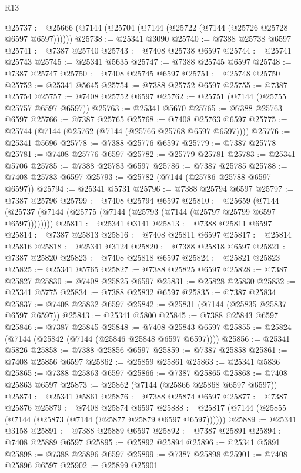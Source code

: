 \begin{lexlean}{R13}
\begin{coremodule}
@25737 := @25666 (@7144 (@25704 (@7144 (@25722 (@7144 (@25726 @25728 @6597 @6597))))))
@25738 := @25341 @3090
@25740 := @7388 @25738 @6597
@25741 := @7387 @25740
@25743 := @7408 @25738 @6597
@25744 := @25741 @25743
@25745 := @25341 @5635
@25747 := @7388 @25745 @6597
@25748 := @7387 @25747
@25750 := @7408 @25745 @6597
@25751 := @25748 @25750
@25752 := @25341 @5645
@25754 := @7388 @25752 @6597
@25755 := @7387 @25754
@25757 := @7408 @25752 @6597
@25762 := @25751 (@7144 (@25755 @25757 @6597 @6597))
@25763 := @25341 @5670
@25765 := @7388 @25763 @6597
@25766 := @7387 @25765
@25768 := @7408 @25763 @6597
@25775 := @25744 (@7144 (@25762 (@7144 (@25766 @25768 @6597 @6597))))
@25776 := @25341 @5696
@25778 := @7388 @25776 @6597
@25779 := @7387 @25778
@25781 := @7408 @25776 @6597
@25782 := @25779 @25781
@25783 := @25341 @5706
@25785 := @7388 @25783 @6597
@25786 := @7387 @25785
@25788 := @7408 @25783 @6597
@25793 := @25782 (@7144 (@25786 @25788 @6597 @6597))
@25794 := @25341 @5731
@25796 := @7388 @25794 @6597
@25797 := @7387 @25796
@25799 := @7408 @25794 @6597
@25810 := @25659
    (@7144 (@25737 (@7144 (@25775 (@7144 (@25793 (@7144 (@25797 @25799 @6597 @6597))))))))
@25811 := @25341 @3141
@25813 := @7388 @25811 @6597
@25814 := @7387 @25813
@25816 := @7408 @25811 @6597
@25817 := @25814 @25816
@25818 := @25341 @3124
@25820 := @7388 @25818 @6597
@25821 := @7387 @25820
@25823 := @7408 @25818 @6597
@25824 := @25821 @25823
@25825 := @25341 @5765
@25827 := @7388 @25825 @6597
@25828 := @7387 @25827
@25830 := @7408 @25825 @6597
@25831 := @25828 @25830
@25832 := @25341 @5775
@25834 := @7388 @25832 @6597
@25835 := @7387 @25834
@25837 := @7408 @25832 @6597
@25842 := @25831 (@7144 (@25835 @25837 @6597 @6597))
@25843 := @25341 @5800
@25845 := @7388 @25843 @6597
@25846 := @7387 @25845
@25848 := @7408 @25843 @6597
@25855 := @25824 (@7144 (@25842 (@7144 (@25846 @25848 @6597 @6597))))
@25856 := @25341 @5826
@25858 := @7388 @25856 @6597
@25859 := @7387 @25858
@25861 := @7408 @25856 @6597
@25862 := @25859 @25861
@25863 := @25341 @5836
@25865 := @7388 @25863 @6597
@25866 := @7387 @25865
@25868 := @7408 @25863 @6597
@25873 := @25862 (@7144 (@25866 @25868 @6597 @6597))
@25874 := @25341 @5861
@25876 := @7388 @25874 @6597
@25877 := @7387 @25876
@25879 := @7408 @25874 @6597
@25888 := @25817 (@7144 (@25855 (@7144 (@25873 (@7144 (@25877 @25879 @6597 @6597))))))
@25889 := @25341 @3158
@25891 := @7388 @25889 @6597
@25892 := @7387 @25891
@25894 := @7408 @25889 @6597
@25895 := @25892 @25894
@25896 := @25341 @5891
@25898 := @7388 @25896 @6597
@25899 := @7387 @25898
@25901 := @7408 @25896 @6597
@25902 := @25899 @25901

\end{coremodule}
\end{lexlean}
